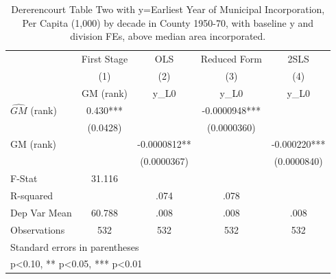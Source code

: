 \begin{table}[htbp]\centering
\def\sym#1{\ifmmode^{#1}\else\(^{#1}\)\fi}
\caption{Dererencourt Table Two with y=Earliest Year of Municipal Incorporation, Per Capita (1,000) by decade in County 1950-70, with baseline y and division FEs, above median area incorporated.}
\begin{tabular}{l*{4}{c}}
\toprule
                    & First Stage   &         OLS   &Reduced Form   &        2SLS   \\
                    &\multicolumn{1}{c}{(1)}&\multicolumn{1}{c}{(2)}&\multicolumn{1}{c}{(3)}&\multicolumn{1}{c}{(4)}\\
                    &\multicolumn{1}{c}{GM  (rank)}&\multicolumn{1}{c}{y\_L0}&\multicolumn{1}{c}{y\_L0}&\multicolumn{1}{c}{y\_L0}\\
\midrule
$\hat{GM}$ (rank)   &       0.430***&               &  -0.0000948***&               \\
                    &    (0.0428)   &               & (0.0000360)   &               \\
\addlinespace
GM  (rank)          &               &  -0.0000812** &               &   -0.000220***\\
                    &               & (0.0000367)   &               & (0.0000840)   \\
\midrule
F-Stat              &      31.116   &               &               &               \\
R-squared           &               &        .074   &        .078   &               \\
Dep Var Mean        &      60.788   &        .008   &        .008   &        .008   \\
Observations        &         532   &         532   &         532   &         532   \\
\bottomrule
\multicolumn{5}{l}{\footnotesize Standard errors in parentheses}\\
\multicolumn{5}{l}{\footnotesize * p<0.10, ** p<0.05, *** p<0.01}\\
\end{tabular}
\end{table}
